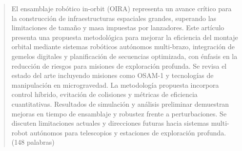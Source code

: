 \begin{abstract}
El ensamblaje robótico in-orbit (OIRA) representa un avance crítico para la construcción de infraestructuras espaciales grandes, superando las limitaciones de tamaño y masa impuestas por lanzadores. Este artículo presenta una propuesta metodológica para mejorar la eficiencia del montaje orbital mediante sistemas robóticos autónomos multi-brazo, integración de gemelos digitales y planificación de secuencias optimizada, con énfasis en la reducción de riesgos para misiones de exploración profunda. Se revisa el estado del arte incluyendo misiones como OSAM-1 y tecnologías de manipulación en microgravedad. La metodología propuesta incorpora control híbrido, evitación de colisiones y métricas de eficiencia cuantitativas. Resultados de simulación y análisis preliminar demuestran mejoras en tiempo de ensamblaje y robustez frente a perturbaciones. Se discuten limitaciones actuales y direcciones futuras hacia sistemas multi-robot autónomos para telescopios y estaciones de exploración profunda. (148 palabras)
\end{abstract}